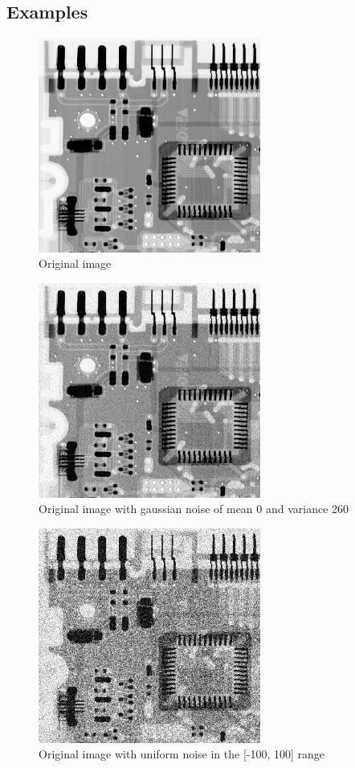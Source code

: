 \documentclass[10pt]{article}
\begin{document}
\subsection{Examples}
\begin{figure}[!ht]
	\centering
	\includegraphics[height=200pt]{./ex4/Circuit.jpg}
	\caption{Original image}
\end{figure}
\begin{figure}[!ht]
	\centering
	\includegraphics[height=200pt]{./ex4/gaussC.jpg}
	\caption{Original image with gaussian noise of mean 0 and variance 260}
\end{figure}
\begin{figure}[!ht]
	\centering
	\includegraphics[height=200pt]{./ex4/uniC.jpg}
	\caption{Original image with uniform noise in the [-100, 100] range}
\end{figure}
\end{document}
